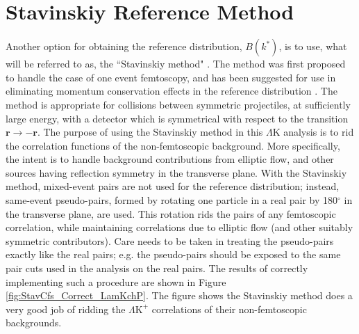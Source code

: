\documentclass[ALICE,manyauthors]{cernphprep}
\newcommand{\LamK}{$\Lambda$K\xspace}
\newcommand{\LamKchP}{$\Lambda\mathrm{K^{+}}$\xspace}
\begin{document}


\newpage
\appendix
%
\renewcommand{\thesubfigure}{\thefigure(\alph{subfigure})}
\makeatletter
\renewcommand{\p@subfigure}{}
\renewcommand{\@thesubfigure}{(\alph{subfigure})\hskip\subfiglabelskip}
%

\section{Stavinskiy Reference Method}
\label{App:StavMethod}

Another option for obtaining the reference distribution, $B(k^{*})$, is to use, what will be referred to as, the ``Stavinskiy method" \cite{Stavinskiy04}.
The method was first proposed to handle the case of one event femtoscopy, and has been suggested for use in eliminating momentum conservation effects in the reference distribution \cite{Lisa:2005dd}.
The method is appropriate for collisions between symmetric projectiles, at sufficiently large energy, with a detector which is symmetrical with respect to the transition $\mathbf{r} \rightarrow \mathbf{-r}$.
{}
The purpose of using the Stavinskiy method in this \LamK analysis is to rid the correlation functions of the non-femtoscopic background.  
More specifically, the intent is to handle background contributions from elliptic flow, and other sources having reflection symmetry in the transverse plane.  
With the Stavinskiy method, mixed-event pairs are not used for the reference distribution; instead, same-event pseudo-pairs, formed by rotating one particle in a real pair by 180$^\circ$ in the transverse plane, are used.  
This rotation rids the pairs of any femtoscopic correlation, while maintaining correlations due to elliptic flow (and other suitably symmetric contributors).
Care needs to be taken in treating the pseudo-pairs exactly like the real pairs; e.g. the pseudo-pairs should be exposed to the same pair cuts used in the analysis on the real pairs.
The results of correctly implementing such a procedure are shown in Figure \ref{fig:StavCfs_Correct_LamKchP}.  
The figure shows the Stavinskiy method does a very good job of ridding the \LamKchP correlations of their non-femtoscopic backgrounds.  
\end{document}
